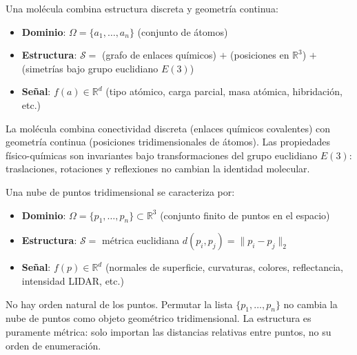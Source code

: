 \begin{example}\label{ex:molecula}
Una molécula combina estructura discreta y geometría continua:
\begin{itemize}
	\item \textbf{Dominio}: $\Omega = \{a_1, \ldots, a_n\}$ (conjunto de átomos)
	\item \textbf{Estructura}: $\mathcal{S} = $ (grafo de enlaces químicos) $+$ (posiciones en $\mathbb{R}^3$) $+$ (simetrías bajo grupo euclidiano $E(3)$)
	\item \textbf{Señal}: $f(a) \in \mathbb{R}^d$ (tipo atómico, carga parcial, masa atómica, hibridación, etc.)
\end{itemize}

La molécula combina conectividad discreta (enlaces químicos covalentes) con geometría continua (posiciones tridimensionales de átomos). Las propiedades físico-químicas son invariantes bajo transformaciones del grupo euclidiano $E(3)$: traslaciones, rotaciones y reflexiones no cambian la identidad molecular.
\end{example}

\begin{example}\label{ex:nube_puntos}
Una nube de puntos tridimensional se caracteriza por:
\begin{itemize}
	\item \textbf{Dominio}: $\Omega = \{p_1, \ldots, p_n\} \subset \mathbb{R}^3$ (conjunto finito de puntos en el espacio)
	\item \textbf{Estructura}: $\mathcal{S} = $ métrica euclidiana $d(p_i, p_j) = \|p_i - p_j\|_2$
	\item \textbf{Señal}: $f(p) \in \mathbb{R}^d$ (normales de superficie, curvaturas, colores, reflectancia, intensidad LIDAR, etc.)
\end{itemize}

No hay orden natural de los puntos. Permutar la lista $\{p_1,\ldots,p_n\}$ no cambia la nube de puntos como objeto geométrico tridimensional. La estructura es puramente métrica: solo importan las distancias relativas entre puntos, no su orden de enumeración.
\end{example}

